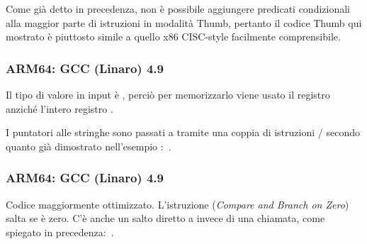
Come già detto in precedenza, non è possibile aggiungere predicati condizionali alla maggior parte di istruzioni in modalità
Thumb, pertanto il codice Thumb qui mostrato è piuttosto simile a quello x86 \ac{CISC}-style facilmente comprensibile.

\subsubsection{ARM64: \NonOptimizing GCC (Linaro) 4.9}



Il tipo di valore in input è \Tint, perciò per memorizzarlo viene usato il registro  anziché l'intero registro .

I puntatori alle stringhe sono passati a \puts tramite una coppia di istruzioni / secondo quanto già dimostrato
nell'esempio \q{\HelloWorldSectionName}:~.

\subsubsection{ARM64: \Optimizing GCC (Linaro) 4.9}



Codice maggiormente ottimizzato.
L'istruzione  (\emph{Compare and Branch on Zero}) salta se  è zero.
C'è anche un salto diretto a \puts invece di una chiamata, come spiegato in precedenza:~.

